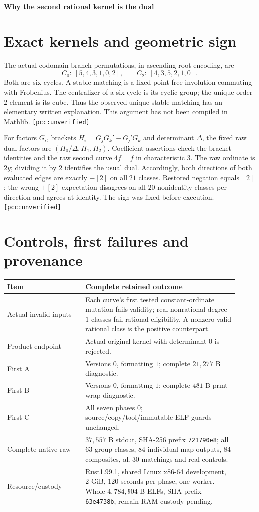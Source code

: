 \documentclass[10pt,a4paper]{article}
\newcommand{\uv}{\texttt{[pcc:unverified]}}
\begin{document}
\newpage
{\Large\bfseries Why the second rational kernel is the dual}\par

\section{Exact kernels and geometric sign}
The actual codomain branch permutations, in ascending root encoding, are
\[
 C_0:\ [5,4,3,1,0,2],\qquad C_2:\ [4,3,5,2,1,0].
\]
Both are six-cycles. A stable matching is a fixed-point-free involution
commuting with Frobenius. The centralizer of a six-cycle is its cyclic
group; the unique order-$2$ element is its cube. Thus the observed unique
stable matching has an elementary written explanation. This argument has
not been compiled in Mathlib. \uv

For factors $G_i$, brackets $H_i=G_jG_k'-G_j'G_k$ and determinant
$\Delta$, the fixed raw dual factors are
$(H_0/\Delta,H_1,H_2)$. Coefficient assertions check the bracket identities
and the raw second curve $4f=f$ in characteristic $3$.
The raw ordinate is $2y$; dividing it by $2$ identifies the usual dual.
Accordingly, both directions of both evaluated edges are exactly $-[2]$
on all $21$ classes. Restored negation equals $[2]$; the wrong $+[2]$
expectation disagrees on all $20$ nonidentity classes per direction and
agrees at identity. The sign was fixed before execution. \uv

\section{Controls, first failures and provenance}
\begin{center}\begin{tabular}{@{}L{0.31\linewidth}L{0.61\linewidth}@{}}
\toprule
Item & Complete retained outcome\\\midrule
Actual invalid inputs & Each curve's first tested constant-ordinate mutation
fails validity; real nonrational degree-$1$ classes fail rational eligibility.
A nonzero valid rational class is the positive counterpart.\\
Product endpoint & Actual original kernel with determinant $0$ is rejected.\\
First A & Versions $0$, formatting $1$; complete $21{,}277$ B diagnostic.\\
First B & Versions $0$, formatting $1$; complete $481$ B print-wrap diagnostic.\\
First C & All seven phases $0$; source/copy/tool/immutable-ELF guards unchanged.\\
Complete native raw & $37{,}557$ B stdout, SHA-256 prefix \texttt{721790e8};
all $63$ group classes, $84$ individual map outputs, $84$ composites,
all $30$ matchings and real controls.\\
Resource/custody & Rust1.99.1, shared Linux x86-64 development, $2$ GiB,
$120$ seconds per phase, one worker. Whole $4{,}784{,}904$ B ELFs,
SHA prefix \texttt{63e4738b}, remain RAM custody-pending.\\
\bottomrule\end{tabular}\end{center}
\end{document}
